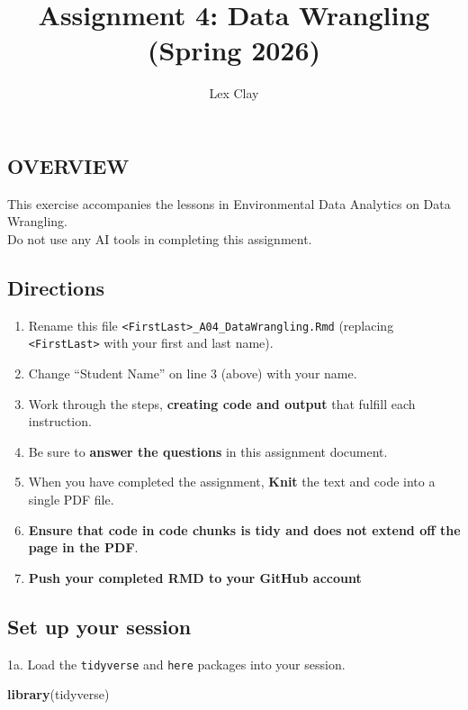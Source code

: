 \documentclass[
]{article}
\title{Assignment 4: Data Wrangling (Spring 2026)}
\author{Lex Clay}
\date{}
\newenvironment{Shaded}{\begin{snugshade}}{\end{snugshade}}
\newcommand{\FunctionTok}[1]{\textcolor[rgb]{0.13,0.29,0.53}{\textbf{#1}}}
\newcommand{\NormalTok}[1]{#1}
\providecommand{\tightlist}{%
  \setlength{\itemsep}{0pt}\setlength{\parskip}{0pt}}
\begin{document}
\maketitle

\subsection{OVERVIEW}\label{overview}

This exercise accompanies the lessons in Environmental Data Analytics on
Data Wrangling.\\
Do not use any AI tools in completing this assignment.

\subsection{Directions}\label{directions}

\begin{enumerate}
\def\labelenumi{\arabic{enumi}.}
\tightlist
\item
  Rename this file
  \texttt{\textless{}FirstLast\textgreater{}\_A04\_DataWrangling.Rmd}
  (replacing \texttt{\textless{}FirstLast\textgreater{}} with your first
  and last name).
\item
  Change ``Student Name'' on line 3 (above) with your name.
\item
  Work through the steps, \textbf{creating code and output} that fulfill
  each instruction.
\item
  Be sure to \textbf{answer the questions} in this assignment document.
\item
  When you have completed the assignment, \textbf{Knit} the text and
  code into a single PDF file.
\item
  \textbf{Ensure that code in code chunks is tidy and does not extend
  off the page in the PDF}.
\item
  \textbf{Push your completed RMD to your GitHub account}
\end{enumerate}

\subsection{Set up your session}\label{set-up-your-session}

1a. Load the \texttt{tidyverse} and \texttt{here} packages into your
session.

\begin{Shaded}
\begin{Highlighting}[]
\FunctionTok{library}\NormalTok{(tidyverse)}
\end{Highlighting}
\end{Shaded}
\end{document}
